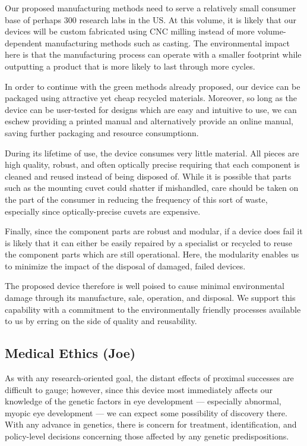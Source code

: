 \documentclass{article}
\begin{document}
Our proposed manufacturing methods need to serve a relatively small
consumer base of perhaps 300 research labs in the US. At this volume,
it is likely that our devices will be custom fabricated using CNC
milling instead of more volume-dependent manufacturing methods such as
casting. The environmental impact here is that the manufacturing
process can operate with a smaller footprint while outputting a
product that is more likely to last through more cycles.

In order to continue with the green methods already proposed, our
device can be packaged using attractive yet cheap recycled
materials. Moreover, so long as the device can be user-tested for
designs which are easy and intuitive to use, we can eschew providing a
printed manual and alternatively provide an online manual, saving
further packaging and resource consumptionn.

During its lifetime of use, the device consumes very little
material. All pieces are high quality, robust, and often optically
precise requiring that each component is cleaned and reused instead of
being disposed of. While it is possible that parts such as the
mounting cuvet could shatter if mishandled, care should be taken on
the part of the consumer in reducing the frequency of this sort of
waste, especially since optically-precise cuvets are expensive.

Finally, since the component parts are robust and modular, if a device
does fail it is likely that it can either be easily repaired by a
specialist or recycled to reuse the component parts which are still
operational. Here, the modularity enables us to minimize the impact of
the disposal of damaged, failed devices.

The proposed device therefore is well poised to cause minimal
environmental damage through its manufacture, sale, operation, and
disposal. We support this capability with a commitment to the
environmentally friendly processes available to us by erring on the
side of quality and reusability.


\subsection{Medical Ethics (Joe)}
\label{sec:blah-blah-blah}

As with any research-oriented goal, the distant effects of proximal
successes are difficult to gauge; however, since this device most
immediately affects our knowledge of the genetic factors in eye
development --- especially abnormal, myopic eye development --- we can
expect some possibility of discovery there. With any advance in
genetics, there is concern for treatment, identification, and
policy-level decisions concerning those affected by any genetic
predispositions.
\end{document}
